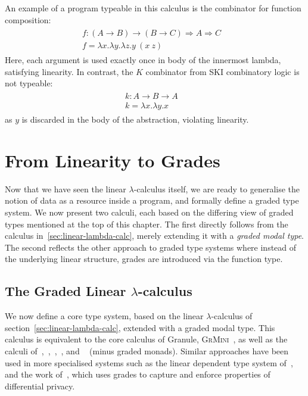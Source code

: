 An example of a program typeable in this calculus is the combinator for function
composition: 
\begin{align*}
  \tag{well-typed}
\begin{array}{ll}
    f : (A \rightarrow B) \rightarrow (B \rightarrow C) \Rightarrow A \Rightarrow C &
    \\
    f = \lambda x. \lambda y. \lambda z. y\ (x\ z) &
\end{array}  
\end{align*}
Here, each argument is used exactly once in body of the innermost lambda, satisfying 
linearity. In contrast, the $K$ combinator from SKI combinatory logic is not typeable:
\begin{align*}
  \tag{ill-typed}
\begin{array}{ll}
    k : A \rightarrow B \rightarrow A &
    \\
    k = \lambda x. \lambda y. x &
\end{array}  
\end{align*}
as $y$ is discarded in the body of the abstraction, violating linearity.

\section{From Linearity to Grades}

Now that we have seen the linear $\lambda$-calculus itself, we are ready to
generalise the notion of data as a resource inside a program, and formally
define a graded type system. We now present two calculi, each based on the
differing view of graded types mentioned at the top of this chapter. The first
directly follows from the calculus in~\ref{sec:linear-lambda-calc}, merely
extending it with a \emph{graded modal type}. The second reflects the other
approach to graded type systems where instead of the underlying linear
structure, grades are introduced via the function type. 

\subsection{The Graded Linear $\lambda$-calculus}
\label{sec:linear-base}
We now define a core type system, based on the linear $\lambda$-calculus of
section~\ref{sec:linear-lambda-calc}, extended with a graded modal type. This
calculus is equivalent to the core calculus of Granule,
\textsc{GrMini}~\citep{DBLP:journals/pacmpl/OrchardLE19}, as well as the calculi
of~\citet{brunel2014core},~\citet{DBLP:conf/esop/GhicaS14},~\citet{coeffects-thesis},~\citet{petricek2014coeffects},
and ~\citet{DBLP:conf/icfp/GaboardiKOBU16} (minus graded monads). Similar
approaches have been used in more specialised systems such as the linear
dependent type system of~\citet{Lago_2012}, and the work
of~\citet{gaboardi2013linear}, which uses grades to capture and enforce
properties of differential privacy.

